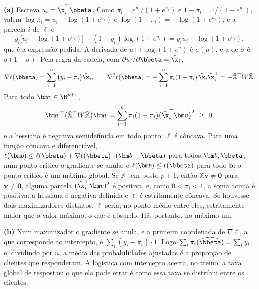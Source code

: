 \begin{solucao}
\textbf{(a)} Escreva $u_i=\tilde\x_i^\top\bbeta$. Como $\pi_i=e^{u_i}/(1+e^{u_i})$ e
$1-\pi_i=1/(1+e^{u_i})$, valem $\log\pi_i=u_i-\log(1+e^{u_i})$ e
$\log(1-\pi_i)=-\log(1+e^{u_i})$, e a parcela $i$ de $\ell$ é
\[
  y_i\big[u_i-\log(1+e^{u_i})\big]-(1-y_i)\log(1+e^{u_i})=y_iu_i-\log(1+e^{u_i}),
\]
que é a expressão pedida. A derivada de $u\mapsto\log(1+e^u)$ é $\sigma(u)$, e a de
$\sigma$ é $\sigma(1-\sigma)$. Pela regra da cadeia, com $\partial u_i/\partial\bbeta=\tilde\x_i$,
\[
  \nabla\ell(\bbeta)=\sum_{i=1}^n\big(y_i-\pi_i\big)\tilde\x_i,
  \qquad
  \nabla^2\ell(\bbeta)=-\sum_{i=1}^n\pi_i(1-\pi_i)\,\tilde\x_i\tilde\x_i^\top
   =-\tilde{\mathbb X}^\top W\tilde{\mathbb X}.
\]
Para todo $\bm v\in\R^{p+1}$,
\[
  \bm v^\top\big(\tilde{\mathbb X}^\top W\tilde{\mathbb X}\big)\bm v
  =\sum_{i=1}^n\pi_i(1-\pi_i)\big(\tilde\x_i^\top\bm v\big)^2\ \ge\ 0 ,
\]
e a hessiana é negativa semidefinida em todo ponto: $\ell$ é côncava. Para uma função
côncava e diferenciável, $\ell(\bm b)\le\ell(\bbeta)+\nabla\ell(\bbeta)^\top(\bm b-\bbeta)$
para todos $\bm b,\bbeta$; num ponto crítico o gradiente se anula, e $\ell(\bm b)\le\ell(\bbeta)$
para todo $\bm b$: o ponto crítico é um máximo global. Se $\tilde{\mathbb X}$ tem posto
$p+1$, então $\tilde{\mathbb X}\bm v\ne\bm0$ para $\bm v\ne\bm0$, alguma parcela
$(\tilde\x_i^\top\bm v)^2$ é positiva, e, como $0<\pi_i<1$, a soma acima é positiva: a
hessiana é negativa definida e $\ell$ é estritamente côncava. Se houvesse dois
maximizadores distintos, $\ell$ seria, no ponto médio entre eles, estritamente maior que o
valor máximo, o que é absurdo. Há, portanto, no máximo um.

\smallskip
\textbf{(b)} Num maximizador o gradiente se anula, e a primeira coordenada de
$\nabla\ell$, a que corresponde ao intercepto, é $\sum_i(y_i-\pi_i)\cdot1$. Logo
$\sum_i\pi_i(\widehat\bbeta)=\sum_iy_i$, e, dividindo por $n$, a média das probabilidades
ajustadas é a proporção de clientes que responderam. A logística com intercepto acerta, no
treino, a taxa global de respostas: o que ela pode errar é como essa taxa se distribui entre
os clientes.


\end{solucao}

